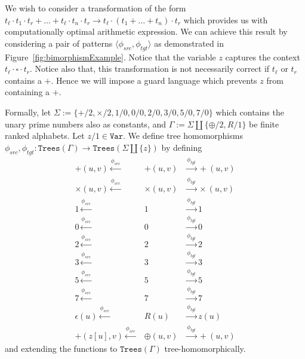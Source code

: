 \documentclass[12pt, a4paper]{article}
\newcommand{\Alphabet}{\ensuremath{\Sigma}}
\newcommand{\Variables}{\texttt{Var}}
\newcommand{\Trees}[1]{\ensuremath{\texttt{Trees}\left(#1\right)}}
\newcommand{\src}{\mathit{src}}
\newcommand{\sourceMap}{\ensuremath{\phi_{\src}}}
\newcommand{\tgt}{\mathit{tgt}}
\newcommand{\targetMap}{\ensuremath{\phi_{\tgt}}}
\begin{document}
\begin{example}\label{exmp:distributivity2}
	We wish to consider a transformation of the form $t_\ell \cdot t_1 \cdot t_r + \dots  + t_\ell \cdot t_n \cdot t_r  \to t_\ell \cdot (t_1 + \dots + t_n) \cdot  t_r$  which provides us with computationally optimal arithmetic expression. 
	We can achieve this result by considering a pair of patterns $\langle \sourceMap, \targetMap \rangle$ as demonstrated in Figure~\ref{fig:bimorphismExample}. Notice that the variable $z$ captures the context $t_\ell \cdot \square \cdot t_r$.  Notice also that, this transformation is not necessarily correct if $t_\ell$ or $t_r$ contains a $+$. Hence we will impose a guard language which prevents $z$ from containing a $+$. 

	Formally, let $\Alphabet := \{+/2, \times/2, 1/0, 0/0, 2/0, 3/0, 5/0, 7/0\}$ which contains the unary prime numbers also as constants,  and $\Gamma := \Alphabet \coprod \{\oplus/2, R/1\}$ be finite ranked alphabets. Let $z/1 \in \Variables$. We define tree homomorphisms $\sourceMap, \targetMap : \Trees{\Gamma} \to \Trees{\Alphabet \coprod \{z\}}$ by defining
    \begin{eqnarray*}
        +(u, v) \xleftarrow{\sourceMap} & +(u, v) & \xrightarrow{\targetMap} +(u, v)\\
        \times(u, v) \xleftarrow{\sourceMap} & \times(u, v) & \xrightarrow{\targetMap} \times(u, v)\\
        1 \xleftarrow{\sourceMap} & 1 & \xrightarrow{\targetMap} 1\\
        0 \xleftarrow{\sourceMap} & 0 & \xrightarrow{\targetMap} 0\\
        2 \xleftarrow{\sourceMap} & 2 & \xrightarrow{\targetMap} 2\\
        3 \xleftarrow{\sourceMap} & 3 & \xrightarrow{\targetMap} 3\\
        5 \xleftarrow{\sourceMap} & 5 & \xrightarrow{\targetMap} 5\\
        7 \xleftarrow{\sourceMap} & 7 & \xrightarrow{\targetMap} 7\\
        \epsilon(u) \xleftarrow{\sourceMap} & R(u) & \xrightarrow{\targetMap} z(u)\\
        +(z[u], v) \xleftarrow{\sourceMap} & \oplus(u, v) & \xrightarrow{\targetMap} +(u, v)
    \end{eqnarray*}
    and extending the functions to $\Trees{\Gamma}$ tree-homomorphically.

\end{example}
\end{document}
